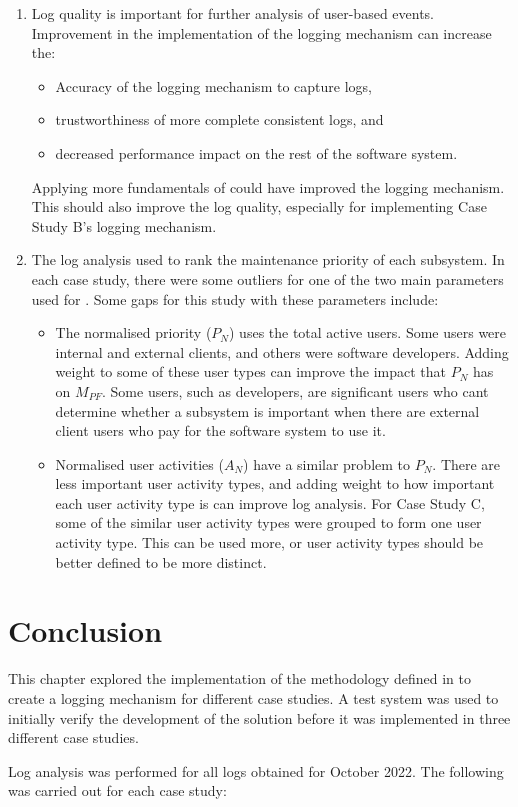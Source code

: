 \begin{enumerate}
	\item Log quality is important for further analysis of user-based events. Improvement in the implementation of the logging mechanism can increase the:
		\begin{itemize}
			\item Accuracy of the logging mechanism to capture logs,
			\item trustworthiness of more complete consistent logs, and
			\item decreased performance impact on the rest of the software system.
		\end{itemize}
	Applying more fundamentals of  could have improved the logging mechanism. This should also improve the log quality, especially for implementing Case Study B's logging mechanism.
	\item The log analysis used  to rank the maintenance priority of each subsystem. In each case study, there were some outliers for one of the two main parameters used for . Some gaps for this study with these parameters include:
		\begin{itemize}
			\item The normalised priority ($P_N$) uses the total active users. Some users were internal and external clients, and others were software developers. Adding weight to some of these user types can improve the impact that $P_N$ has on $M_{PF}$. Some users, such as developers, are significant users who cant determine whether a subsystem is important when there are external client users who pay for the software system to use it.
			\item Normalised user activities ($A_N$) have a similar problem to $P_N$. There are less important user activity types, and adding weight to how important each user activity type is can improve log analysis. For Case Study C, some of the similar user activity types were grouped to form one user activity type. This can be used more, or user activity types should be better defined to be more distinct.
		\end{itemize}
\end{enumerate}

\section{Conclusion}
This chapter explored the implementation of the methodology defined in  to create a logging mechanism for different case studies. A test system was used to initially verify the development of the solution before it was implemented in three different case studies. \par Log analysis was performed for all logs obtained for October 2022. The following was carried out for each case study:

